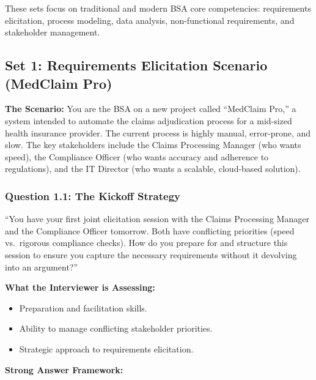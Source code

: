 \documentclass[
  11pt,
  openany,
  oneside]{book}
\providecommand{\tightlist}{%
  \setlength{\itemsep}{0pt}\setlength{\parskip}{0pt}}
\begin{document}
These sets focus on traditional and modern BSA core competencies:
requirements elicitation, process modeling, data analysis,
non-functional requirements, and stakeholder management.

\subsection{Set 1: Requirements Elicitation Scenario (MedClaim
Pro)}\label{set-1-requirements-elicitation-scenario-medclaim-pro}

\textbf{The Scenario:} You are the BSA on a new project called
``MedClaim Pro,'' a system intended to automate the claims adjudication
process for a mid-sized health insurance provider. The current process
is highly manual, error-prone, and slow. The key stakeholders include
the Claims Processing Manager (who wants speed), the Compliance Officer
(who wants accuracy and adherence to regulations), and the IT Director
(who wants a scalable, cloud-based solution).

\subsubsection{Question 1.1: The Kickoff
Strategy}\label{question-1.1-the-kickoff-strategy}

``You have your first joint elicitation session with the Claims
Processing Manager and the Compliance Officer tomorrow. Both have
conflicting priorities (speed vs.~rigorous compliance checks). How do
you prepare for and structure this session to ensure you capture the
necessary requirements without it devolving into an argument?''

\textbf{What the Interviewer is Assessing:}

\begin{itemize}
\tightlist
\item
  Preparation and facilitation skills.
\item
  Ability to manage conflicting stakeholder priorities.
\item
  Strategic approach to requirements elicitation.
\end{itemize}

\textbf{Strong Answer Framework:}
\end{document}
